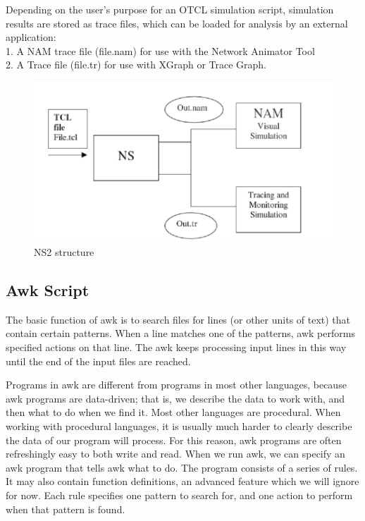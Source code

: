 \documentclass[MTech]{iitmdiss}
\begin{document}
Depending on the user's purpose for an OTCL simulation script, simulation results are stored 
as trace files, which can be loaded for analysis by an external application: 
\\
1. A NAM trace file (file.nam) for use with the Network Animator Tool
\\
2. A Trace file (file.tr) for use with XGraph or Trace Graph. 
\begin{figure}[ht!]
\centering
\includegraphics[scale=0.65]{nspic.PNG}
\caption{NS2 structure\label{overflow}}
\label{f5}
\end{figure}
\subsection{Awk Script}
The basic function of  awk  is to search files for lines (or other units of text) that 
contain certain patterns. When a line matches one of the patterns, awk  performs specified 
actions on that line. The awk  keeps processing input lines in  this way until the end of the input 
files are reached.


Programs in awk are different from programs in most other languages, because awk programs 
are data-driven; that is, we describe the data to work with, and then what to do when we find 
it. Most other languages are  procedural.  When working with procedural languages, it is 
usually much harder to clearly describe the data of our program will process. For this 
reason, awk programs are often refreshingly easy to both write and read.
When we run  awk, we can specify an  awk  program  that tells  awk  what to do. The program 
consists of a series of  rules. It may also contain  function definitions, an advanced feature 
which we will ignore for now. Each rule specifies one pattern to search for, and one action to 
perform when that pattern is found. 
\end{document}
